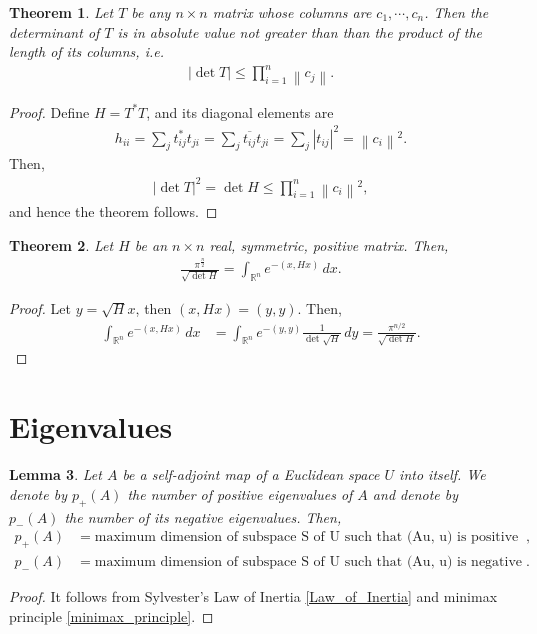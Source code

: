 \documentclass[11pt]{book}
\newtheorem{theorem}{Theorem}[chapter]
\newtheorem{lemma}[theorem]{Lemma}
\theoremstyle{definition}
\numberwithin{equation}{chapter}
\begin{document}
\medskip

\begin{theorem}
Let $T$ be any $n \times n$ matrix whose columns are $c_1, \cdots, c_n$. Then the determinant of $T$ is in absolute value not greater than than the product of the length of its columns, i.e.
\begin{align*}
    \left|\det T \right| \leq \prod^n_{i=1} \left\|c_j \right\|.
\end{align*}
\end{theorem}
\begin{proof}
Define $H = T^*T$, and its diagonal elements are
\begin{align*}
    h_{ii} = \sum_j t^*_{ij}t_{ji} = \sum_j \overline{t_{ij}} t_{ji} = \sum_j \left|t_{ij}\right|^2 = \left\|c_i \right\|^2.
\end{align*}
Then,
\begin{align*}
    \left|\det T \right|^2 = \det H \leq \prod^n_{i=1} \left\|c_i \right\|^2,
\end{align*}
and hence the theorem follows.
\end{proof}

\medskip

\begin{theorem}
Let $H$ be an $n \times n$ real, symmetric, positive matrix. Then,
\begin{align*}
    \frac{\pi^{\frac{n}{2}}}{\sqrt{\det H}} = \int_{\mathbb{R}^n} e^{-(x,Hx)}\, dx.
\end{align*}
\end{theorem}
\begin{proof}
Let $y = \sqrt{H}x$, then $(x, Hx) = (y, y)$. Then,
\begin{align*}
    \int_{\mathbb{R}^n} e^{-(x,Hx)}\, dx & = \int_{\mathbb{R}^n} e^{-(y,y)} \frac{1}{\det \sqrt{H}} \, dy = \frac{\pi^{n/2}}{\sqrt{\det H}}.
\end{align*}
\end{proof}

\section{Eigenvalues}
\begin{lemma}
Let $A$ be a self-adjoint map of a Euclidean space $U$ into itself. We denote by $p_+(A)$ the number of positive eigenvalues of $A$ and denote by $p_-(A)$ the number of its negative eigenvalues. Then, 
\begin{align*}
    p_+(A) & = \text{maximum dimension of subspace S of U such that (Au, u) is positive on S}, \\
    p_-(A) & = \text{maximum dimension of subspace S of U such that (Au, u) is negative on S}.
\end{align*}
\end{lemma}
\begin{proof}
It follows from Sylvester’s Law of Inertia \ref{Law_of_Inertia} and minimax principle \ref{minimax_principle}.
\end{proof}
\end{document}
